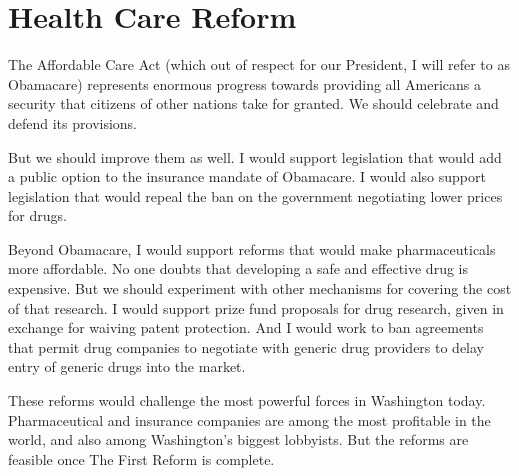 \section{Health Care Reform}

The Affordable Care Act (which out of respect for our President, I will refer to as Obamacare) represents enormous progress towards providing all Americans a security that citizens of other nations take for granted. We should celebrate and defend its provisions.

But we should improve them as well. I would support legislation that would add a public option to the insurance mandate of Obamacare. I would also support legislation that would repeal the ban on the government negotiating lower prices for drugs.

Beyond Obamacare, I would support reforms that would make pharmaceuticals more affordable. No one doubts that developing a safe and effective drug is expensive. But we should experiment with other mechanisms for covering the cost of that research. I would support prize fund proposals for drug research, given in exchange for waiving patent protection. And I would work to ban agreements that permit drug companies to negotiate with generic drug providers to delay entry of generic drugs into the market.

These reforms would challenge the most powerful forces in Washington today. 
Pharmaceutical and insurance companies are among the most profitable in the world, and also among Washington's biggest lobbyists. But the reforms are feasible once The First Reform is complete.
